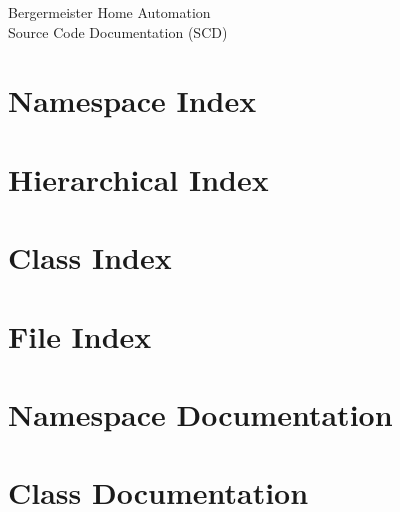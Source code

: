 \documentclass[oneside,letterpaper]{book}
\newcommand{\+}{\discretionary{\mbox{\scriptsize$\hookleftarrow$}}{}{}}
\newcommand{\clearemptydoublepage}{%
  \newpage{\pagestyle{empty}\cleardoublepage}%
}
\begin{document}
\hypersetup{pageanchor=false,
             bookmarksnumbered=true,
             pdfencoding=unicode
            }
\begin{titlepage}
\vspace*{7cm}
\begin{center}%
{\Large Bergermeister Home Automation}\\
\vspace*{1cm}
{\large Source Code Documentation (SCD)}\\
\end{center}
\thispagestyle{fancy}
\end{titlepage}
\setcounter{page}{2}
\tableofcontents
\hypersetup{pageanchor=true}

\chapter{Namespace Index}

\chapter{Hierarchical Index}

\chapter{Class Index}

\chapter{File Index}

\chapter{Namespace Documentation}



\chapter{Class Documentation}












\end{document}
